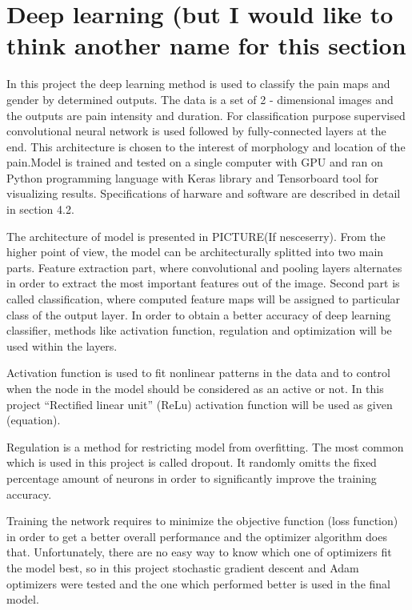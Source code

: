 \section{Deep learning (but I would like to think another name for this section}
In this project the deep learning method is used to classify the pain maps and gender by determined outputs. The data is a set of 2 - dimensional images and the outputs are pain intensity and duration. For classification purpose supervised convolutional neural network is used followed by fully-connected layers at the end. This architecture is chosen to the interest of morphology and location of the pain.Model is trained and tested on a single computer with GPU and ran on Python programming language with Keras library and Tensorboard tool for visualizing results. Specifications of harware and software are described in detail in section 4.2.

The architecture of model is presented in PICTURE(If nesceserry). From the higher point of view, the model can be architecturally splitted into two main parts. Feature extraction part, where convolutional and pooling layers alternates in order to extract the most important features out of the image. Second part is called classification, where computed feature maps will be assigned to particular class of the output layer. In order to obtain a better accuracy of deep learning classifier, methods like activation function, regulation and optimization will be used within the layers.

Activation function is used to fit nonlinear patterns in the data and to control when the node in the model should be considered as an active or not.  In this project “Rectified linear unit” (ReLu) activation function will be used as given (equation).

Regulation is a method for restricting model from overfitting. The most common which is used in this project is called dropout. It randomly omitts the fixed percentage amount of neurons in order to significantly improve the training accuracy.

Training the network requires to minimize the objective function (loss function) in order to get a better overall performance and the optimizer algorithm does that. Unfortunately, there are no easy way to know which one of optimizers fit the model best, so in this project stochastic gradient descent and Adam optimizers were tested and the one which performed better is used in the final model.

